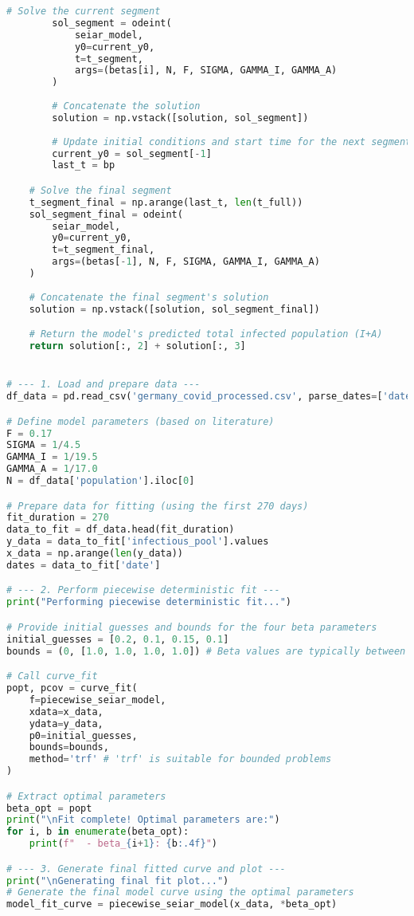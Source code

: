 \begin{lstlisting}[language=Python, caption={Python script for fitting a four-stage piecewise deterministic SEIAR model, aligning with the Bayesian model's structure.}]
        # Solve the current segment
        sol_segment = odeint(
            seiar_model,
            y0=current_y0,
            t=t_segment,
            args=(betas[i], N, F, SIGMA, GAMMA_I, GAMMA_A)
        )
        
        # Concatenate the solution
        solution = np.vstack([solution, sol_segment])
        
        # Update initial conditions and start time for the next segment
        current_y0 = sol_segment[-1]
        last_t = bp

    # Solve the final segment
    t_segment_final = np.arange(last_t, len(t_full))
    sol_segment_final = odeint(
        seiar_model,
        y0=current_y0,
        t=t_segment_final,
        args=(betas[-1], N, F, SIGMA, GAMMA_I, GAMMA_A)
    )
    
    # Concatenate the final segment's solution
    solution = np.vstack([solution, sol_segment_final])

    # Return the model's predicted total infected population (I+A)
    return solution[:, 2] + solution[:, 3]


# --- 1. Load and prepare data ---
df_data = pd.read_csv('germany_covid_processed.csv', parse_dates=['date'])

# Define model parameters (based on literature)
F = 0.17
SIGMA = 1/4.5
GAMMA_I = 1/19.5
GAMMA_A = 1/17.0
N = df_data['population'].iloc[0]

# Prepare data for fitting (using the first 270 days)
fit_duration = 270
data_to_fit = df_data.head(fit_duration)
y_data = data_to_fit['infectious_pool'].values
x_data = np.arange(len(y_data))
dates = data_to_fit['date']

# --- 2. Perform piecewise deterministic fit ---
print("Performing piecewise deterministic fit...")

# Provide initial guesses and bounds for the four beta parameters
initial_guesses = [0.2, 0.1, 0.15, 0.1]
bounds = (0, [1.0, 1.0, 1.0, 1.0]) # Beta values are typically between 0 and 1

# Call curve_fit
popt, pcov = curve_fit(
    f=piecewise_seiar_model,
    xdata=x_data,
    ydata=y_data,
    p0=initial_guesses,
    bounds=bounds,
    method='trf' # 'trf' is suitable for bounded problems
)

# Extract optimal parameters
beta_opt = popt
print("\nFit complete! Optimal parameters are:")
for i, b in enumerate(beta_opt):
    print(f"  - beta_{i+1}: {b:.4f}")

# --- 3. Generate final fitted curve and plot ---
print("\nGenerating final fit plot...")
# Generate the final model curve using the optimal parameters
model_fit_curve = piecewise_seiar_model(x_data, *beta_opt)


\end{lstlisting}
